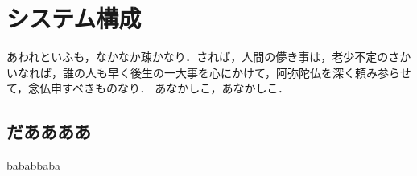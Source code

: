 
\chapter{システム構成}\label{genri}
あわれといふも，なかなか疎かなり．されば，人間の儚き事は，老少不定のさかいなれば，誰の人も早く後生の一大事を心にかけて，阿弥陀仏を深く頼み参らせて，念仏申すべきものなり． あなかしこ，あなかしこ．

\section{だああああ}
bababbaba
